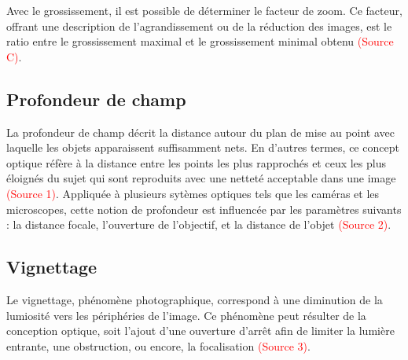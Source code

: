 \documentclass[11pt,letterpaper]{article}
\begin{document}
Avec le grossissement, il est possible de déterminer le facteur de zoom. Ce facteur, offrant une description de l'agrandissement ou de la réduction des images, est le ratio entre le grossissement maximal et le grossissement minimal obtenu \textcolor{red}{(Source C)}.



\subsection{Profondeur de champ}
La profondeur de champ décrit la distance autour du plan de mise au point avec laquelle les objets apparaissent suffisamment nets. En d'autres termes, ce concept optique réfère à la distance entre les points les plus rapprochés et ceux les plus éloignés du sujet qui sont reproduits avec une netteté acceptable dans une image \textcolor{red}{(Source 1)}. Appliquée à plusieurs sytèmes optiques tels que les caméras et les microscopes, cette notion de profondeur est influencée par les paramètres suivants : la distance focale, l'ouverture de l'objectif, et la distance de l'objet \textcolor{red}{(Source 2)}. 



\subsection{Vignettage}
Le vignettage, phénomène photographique, correspond à une diminution de la lumiosité vers les périphéries de l'image. Ce phénomène peut résulter de la conception optique, soit l'ajout d'une ouverture d'arrêt afin de limiter la lumière entrante, une obstruction, ou encore, la focalisation \textcolor{red}{(Source 3)}.

\end{document}
